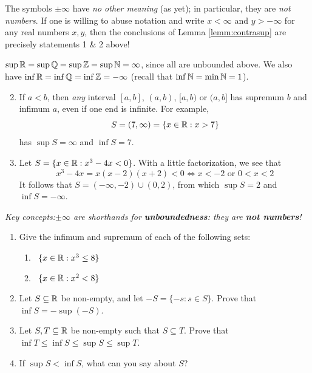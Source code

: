 The symbols $\pm\infty$ have \emph{no other meaning} (as yet); in particular, they are \emph{not numbers}. If one is willing to abuse notation and write $x<\infty$ and $y>-\infty$ for any real numbers $x,y$, then the conclusions of Lemma \ref{lemm:contrasup} are precisely statements 1 \& 2 above!


\begin{examples}{}{}
	\exstart $\sup\mathbb{R}=\sup\mathbb{Q}=\sup\mathbb{Z}=\sup\mathbb{N}=\infty$, since all are unbounded above. We also have $\inf\mathbb{R}=\inf\mathbb{Q}=\inf\mathbb{Z}=-\infty$ (recall that $\inf\mathbb{N}=\min\mathbb{N}=1$).
	\begin{enumerate}\setcounter{enumi}{1}
	  \item If $a<b$, then \emph{any} interval $[a,b]$, $(a,b)$, $[a,b)$ or $(a,b]$ has supremum $b$ and infimum $a$, even if one end is infinite. For example,
		\[
			S=(7,\infty)=\{x\in\mathbb{R}:x>7\}
		\]
		has $\sup S=\infty$ and $\inf S=7$.
		\item Let $S=\{x\in\mathbb{R}:x^3-4x<0\}$. With a little factorization, we see that
		\[
			x^3-4x=x(x-2)(x+2)<0\iff x<-2\text{ or }0<x<2
		\]
		It follows that $S=(-\infty,-2)\cup(0,2)$, from which $\sup S=2$ and $\inf S=-\infty$.  
	\end{enumerate}
\end{examples}


\begin{exercises}{}{}
	\emph{Key concepts:\quad $\pm\infty$ are shorthands for \textbf{unboundedness}: they are \textbf{not numbers}!}


	\begin{enumerate}%
	  \item Give the infimum and supremum of each of the following sets:
	  \begin{enumerate}
	    \item {} \ $\{x\in\mathbb{R}:x^3\le 8\}$
	    \setcounter{enumii}{2}
	    \item {} \ $\{x\in\mathbb{R}:x^2<8\}$
	  \end{enumerate}
	  
	
	  \item%
	  Let $S\subseteq\mathbb{R}$ be non-empty, and let $-S=\{-s:s\in S\}$. Prove that $\inf S=-\sup(-S)$.
	
	
	  \item%
	  Let $S,T\subseteq\mathbb{R}$ be non-empty such that $S\subseteq T$. Prove that $\inf T\le \inf S\le \sup S\le\sup T$.
	  
	  \item If $\sup S<\inf S$, what can you say about $S$?
	  
	\end{enumerate}
\end{exercises}


